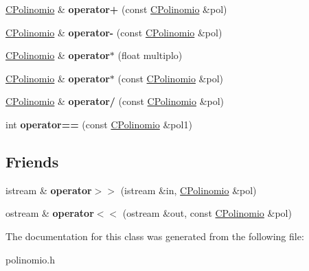\begin{DoxyCompactItemize}
\hyperlink{class_c_polinomio}{C\+Polinomio} \& {\bfseries operator+} (const \hyperlink{class_c_polinomio}{C\+Polinomio} \&pol)
\item 
\hypertarget{class_c_polinomio_a95960bcafe962c57f8f2114af8c4c398}{}\label{class_c_polinomio_a95960bcafe962c57f8f2114af8c4c398} 
\hyperlink{class_c_polinomio}{C\+Polinomio} \& {\bfseries operator-\/} (const \hyperlink{class_c_polinomio}{C\+Polinomio} \&pol)
\item 
\hypertarget{class_c_polinomio_a46e33616fc44a4ee141a7f17405a9351}{}\label{class_c_polinomio_a46e33616fc44a4ee141a7f17405a9351} 
\hyperlink{class_c_polinomio}{C\+Polinomio} \& {\bfseries operator$\ast$} (float multiplo)
\item 
\hypertarget{class_c_polinomio_a44d5ce2e32225c6544ab5937269fd866}{}\label{class_c_polinomio_a44d5ce2e32225c6544ab5937269fd866} 
\hyperlink{class_c_polinomio}{C\+Polinomio} \& {\bfseries operator$\ast$} (const \hyperlink{class_c_polinomio}{C\+Polinomio} \&pol)
\item 
\hypertarget{class_c_polinomio_ac5bdcf74728838f8f433d5cbd29a0d8d}{}\label{class_c_polinomio_ac5bdcf74728838f8f433d5cbd29a0d8d} 
\hyperlink{class_c_polinomio}{C\+Polinomio} \& {\bfseries operator/} (const \hyperlink{class_c_polinomio}{C\+Polinomio} \&pol)
\item 
\hypertarget{class_c_polinomio_a924536e758d558b79fa3408477432418}{}\label{class_c_polinomio_a924536e758d558b79fa3408477432418} 
int {\bfseries operator==} (const \hyperlink{class_c_polinomio}{C\+Polinomio} \&pol1)
\end{DoxyCompactItemize}
\subsection*{Friends}
\begin{DoxyCompactItemize}
\item 
\hypertarget{class_c_polinomio_ae1672ef3b5f73a833399fd83cab8b4d2}{}\label{class_c_polinomio_ae1672ef3b5f73a833399fd83cab8b4d2} 
istream \& {\bfseries operator$>$$>$} (istream \&in, \hyperlink{class_c_polinomio}{C\+Polinomio} \&pol)
\item 
\hypertarget{class_c_polinomio_a4f5b58aff907087ac7792346dd66f822}{}\label{class_c_polinomio_a4f5b58aff907087ac7792346dd66f822} 
ostream \& {\bfseries operator$<$$<$} (ostream \&out, const \hyperlink{class_c_polinomio}{C\+Polinomio} \&pol)
\end{DoxyCompactItemize}


The documentation for this class was generated from the following file\+:\begin{DoxyCompactItemize}
\item 
polinomio.\+h\end{DoxyCompactItemize}
